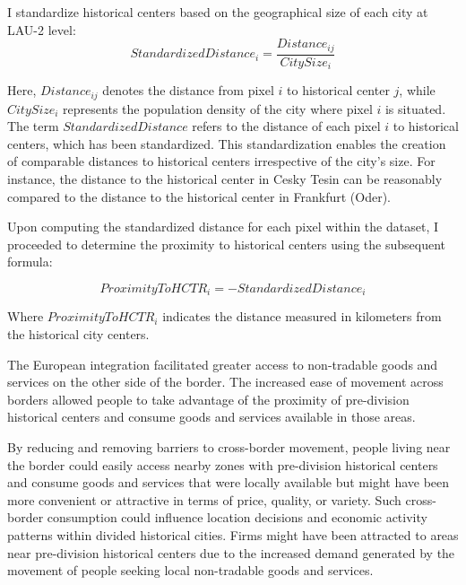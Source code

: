 \documentclass[12pt]{article}    %
\begin{document}
\par I standardize historical centers based on the geographical size of each city at LAU-2 level: 
\begin{equation*}
StandardizedDistance_i=\frac{Distance_{ij}}{CitySize_i} 
\end{equation*}

Here, $Distance_{ij}$ denotes the distance from pixel $i$ to historical center $j$, while $CitySize_i$ represents the population density of the city where pixel $i$ is situated. The term $StandardizedDistance$ refers to the distance of each pixel $i$ to historical centers, which has been standardized. This standardization enables the creation of comparable distances to historical centers irrespective of the city's size. For instance, the distance to the historical center in Cesky Tesin can be reasonably compared to the distance to the historical center in Frankfurt (Oder).

Upon computing the standardized distance for each pixel within the dataset, I proceeded to determine the proximity to historical centers using the subsequent formula:

\begin{equation*}
    ProximityToHCTR_i=-StandardizedDistance_i
\end{equation*}

Where $ProximityToHCTR_i$ indicates the distance measured in kilometers from the historical city centers.

\par The European integration facilitated greater access to non-tradable goods and services on the other side of the border. The increased ease of movement across borders allowed people to take advantage of the proximity of pre-division historical centers and consume goods and services available in those areas.

\par By reducing and removing barriers to cross-border movement, people living near the border could easily access nearby zones with pre-division historical centers and consume goods and services that were locally available but might have been more convenient or attractive in terms of price, quality, or variety. Such cross-border consumption could influence location decisions and economic activity patterns within divided historical cities. Firms might have been attracted to areas near pre-division historical centers due to the increased demand generated by the movement of people seeking local non-tradable goods and services. 
\end{document}

